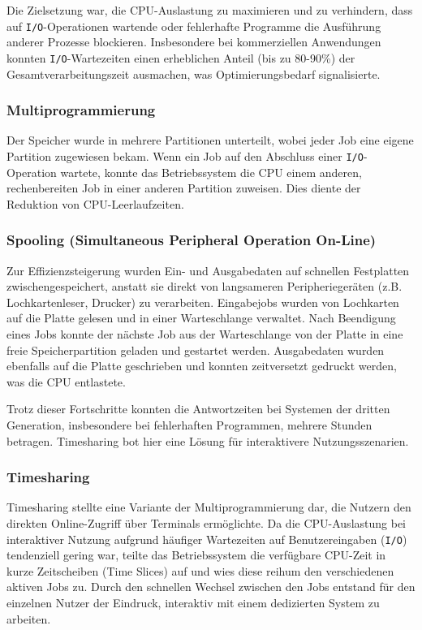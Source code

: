 Die Zielsetzung war, die CPU-Auslastung zu maximieren und zu verhindern, dass auf \texttt{I/O}-Operationen wartende oder fehlerhafte Programme die Ausführung anderer Prozesse blockieren. Insbesondere bei kommerziellen Anwendungen konnten \texttt{I/O}-Wartezeiten einen erheblichen Anteil (bis zu 80-90\%) der Gesamtverarbeitungszeit ausmachen, was Optimierungsbedarf signalisierte.

\subsubsection*{Multiprogrammierung}
Der Speicher wurde in mehrere Partitionen unterteilt, wobei jeder Job eine eigene Partition zugewiesen bekam. Wenn ein Job auf den Abschluss einer \texttt{I/O}-Operation wartete, konnte das Betriebssystem die CPU einem anderen, rechenbereiten Job in einer anderen Partition zuweisen. Dies diente der Reduktion von CPU-Leerlaufzeiten.

\subsubsection*{Spooling (Simultaneous Peripheral Operation On-Line)}
Zur Effizienzsteigerung wurden Ein- und Ausgabedaten auf schnellen Festplatten zwischengespeichert, anstatt sie direkt von langsameren Peripheriegeräten (z.B. Lochkartenleser, Drucker) zu verarbeiten. Eingabejobs wurden von Lochkarten auf die Platte gelesen und in einer Warteschlange verwaltet. Nach Beendigung eines Jobs konnte der nächste Job aus der Warteschlange von der Platte in eine freie Speicherpartition geladen und gestartet werden. Ausgabedaten wurden ebenfalls auf die Platte geschrieben und konnten zeitversetzt gedruckt werden, was die CPU entlastete.

Trotz dieser Fortschritte konnten die Antwortzeiten bei Systemen der dritten Generation, insbesondere bei fehlerhaften Programmen, mehrere Stunden betragen. Timesharing bot hier eine Lösung für interaktivere Nutzungsszenarien.

\subsubsection*{Timesharing}
Timesharing stellte eine Variante der Multiprogrammierung dar, die Nutzern den direkten Online-Zugriff über Terminals ermöglichte. Da die CPU-Auslastung bei interaktiver Nutzung aufgrund häufiger Wartezeiten auf Benutzereingaben (\texttt{I/O}) tendenziell gering war, teilte das Betriebssystem die verfügbare CPU-Zeit in kurze Zeitscheiben (Time Slices) auf und wies diese reihum den verschiedenen aktiven Jobs zu. Durch den schnellen Wechsel zwischen den Jobs entstand für den einzelnen Nutzer der Eindruck, interaktiv mit einem dedizierten System zu arbeiten.


